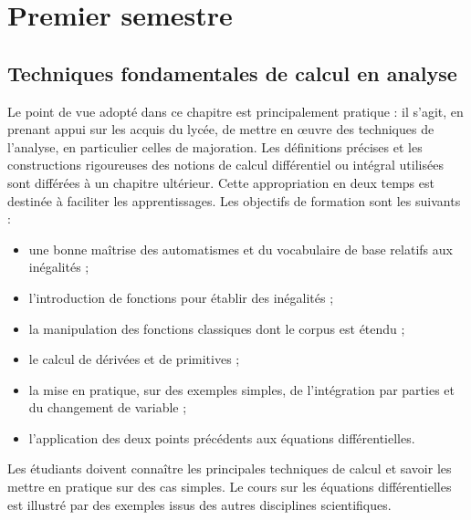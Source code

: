 

\rhead{}




\tableofcontents
\section{Premier semestre}




\subsection{Techniques fondamentales de calcul en analyse}
\begin{itshape}Le point de vue adopté dans ce chapitre est principalement pratique : il s’agit, en prenant appui sur les acquis du lycée, de mettre en œuvre des techniques de l’analyse, en particulier celles de majoration. Les définitions précises et les constructions rigoureuses des notions de calcul différentiel ou intégral utilisées sont différées à un chapitre ultérieur. Cette appropriation en deux temps est destinée à faciliter les apprentissages.
Les objectifs de formation sont les suivants :
\begin{itemize}
 \item  une bonne maîtrise des automatismes et du vocabulaire de base relatifs aux inégalités ;
 \item l’introduction de fonctions pour établir des inégalités ;
 \item la manipulation des fonctions classiques dont le corpus est étendu ;
 \item le calcul de dérivées et de primitives ;
 \item la mise en pratique, sur des exemples simples, de l’intégration par parties et du changement de variable ;
 \item l’application des deux points précédents aux équations différentielles.
\end{itemize}
 Les étudiants doivent connaître les principales techniques de calcul et savoir les mettre en pratique sur des cas simples. Le cours sur les équations différentielles est illustré par des exemples issus des autres disciplines scientifiques.
\end{itshape}

